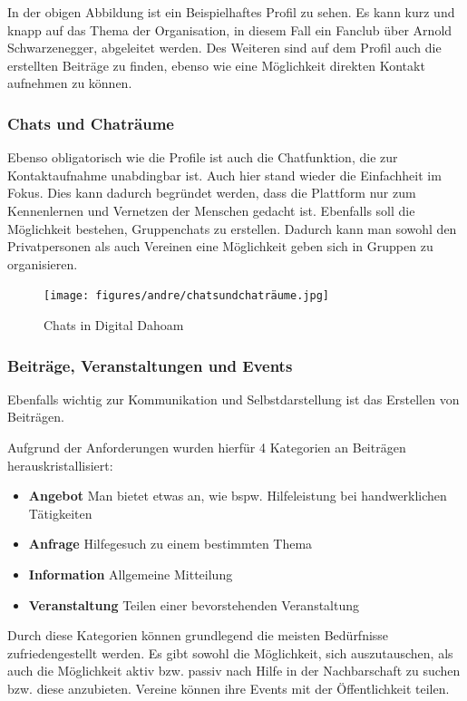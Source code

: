 In der obigen Abbildung ist ein Beispielhaftes Profil zu sehen. Es kann kurz und knapp auf das Thema der Organisation, in diesem Fall ein Fanclub über Arnold Schwarzenegger, abgeleitet werden. Des Weiteren sind auf dem Profil auch die erstellten Beiträge zu finden, ebenso wie eine Möglichkeit direkten Kontakt aufnehmen zu können. 

\subsubsection{Chats und Chaträume}
Ebenso obligatorisch wie die Profile ist auch die Chatfunktion, die zur Kontaktaufnahme unabdingbar ist. 
Auch hier stand wieder die Einfachheit im Fokus. Dies kann dadurch begründet werden, dass die Plattform nur zum Kennenlernen und Vernetzen der Menschen gedacht ist.
Ebenfalls soll die Möglichkeit bestehen, Gruppenchats zu erstellen. Dadurch kann man sowohl den Privatpersonen als auch Vereinen eine Möglichkeit geben sich in Gruppen zu organisieren. 

\begin{figure}[ht!]
    \centering
    \texttt{[image: figures/andre/chatsundchaträume.jpg]}
    \caption{Chats in Digital Dahoam}
    \label{fig:chatsundchaträume}
\end{figure}

\subsubsection{Beiträge, Veranstaltungen und Events}
Ebenfalls wichtig zur Kommunikation und Selbstdarstellung ist das Erstellen von Beiträgen. 

Aufgrund der Anforderungen wurden hierfür 4 Kategorien an Beiträgen herauskristallisiert:

\begin{itemize}
    \item	\textbf{Angebot} Man bietet etwas an, wie bspw. Hilfeleistung bei handwerklichen Tätigkeiten
    \item	\textbf{Anfrage} Hilfegesuch zu einem bestimmten Thema
    \item   \textbf{Information} Allgemeine Mitteilung
    \item 	\textbf{Veranstaltung} Teilen einer bevorstehenden Veranstaltung
\end{itemize}

Durch diese Kategorien können grundlegend die meisten Bedürfnisse zufriedengestellt werden. Es gibt sowohl die Möglichkeit, sich auszutauschen, als auch die Möglichkeit aktiv bzw. passiv nach Hilfe in der Nachbarschaft zu suchen bzw. diese anzubieten. Vereine können ihre Events mit der Öffentlichkeit teilen.

